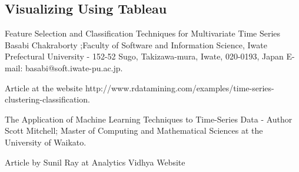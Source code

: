 \documentclass{article}
\begin{document}
\subsection {Visualizing Using Tableau}



\begin{thebibliography}{References}
 Feature Selection and Classification Techniques for Multivariate Time Series
Basabi Chakraborty ;Faculty of Software and Information Science, Iwate Prefectural University - 152-52 Sugo, Takizawa-mura, Iwate, 020-0193, Japan E-mail: basabi@soft.iwate-pu.ac.jp.\newline

 Article at the website http://www.rdatamining.com/examples/time-series-clustering-classification.\newline

 The Application of Machine Learning Techniques to Time-Series Data - Author Scott Mitchell; Master of Computing and Mathematical Sciences at the University of Waikato. \newline

 Article by Sunil Ray at Analytics Vidhya Website


\end{thebibliography}
\end{document}
